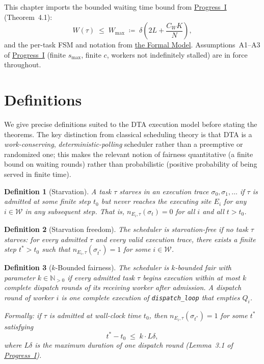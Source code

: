 \documentclass[11pt,a4paper]{article}
\newtheorem{definition}{Definition}[section]
\newcommand{\code}[1]{\texttt{#1}}
\begin{document}
\setcounter{section}{0}

This chapter imports the bounded waiting time bound from
\hyperref[chap:bounded_wait]{Progress~I} (Theorem~4.1):
\[
  W(\tau) \;\leq\; W_{\max}
  \;\coloneqq\; \delta\!\left(2L + \frac{C_W K}{N}\right),
\]
and the per-task FSM and notation from
\hyperref[chap:formal_model]{the Formal Model}.  Assumptions~A1--A3
of \hyperref[chap:bounded_wait]{Progress~I} (finite $s_{\max}$, finite $c$,
workers not indefinitely stalled) are in force throughout.

\section{Definitions}

We give precise definitions suited to the DTA execution model
before stating the theorems.  The key distinction from classical
scheduling theory is that DTA is a \emph{work-conserving},
\emph{deterministic-polling} scheduler rather than a preemptive
or randomized one; this makes the relevant notion of fairness
quantitative (a finite bound on waiting rounds) rather than
probabilistic (positive probability of being served in finite time).

\begin{definition}[Starvation]
\label{def:starve}
A task $\tau$ \emph{starves} in an execution trace
$\sigma_0, \sigma_1, \ldots$ if $\tau$ is admitted at some finite
step $t_0$ but never reaches the executing site $E_i$ for any
$i \in \mathcal{W}$ in any subsequent step.  That is,
$n_{E_i, \tau}(\sigma_t) = 0$ for all $i$ and all $t > t_0$.
\end{definition}

\begin{definition}[Starvation freedom]
\label{def:starve-free}
The scheduler is \emph{starvation-free} if no task $\tau$ starves:
for every admitted $\tau$ and every valid execution trace,
there exists a finite step $t^* > t_0$ such that
$n_{E_i, \tau}(\sigma_{t^*}) = 1$ for some $i \in \mathcal{W}$.
\end{definition}

\begin{definition}[$k$-Bounded fairness]

The scheduler is \emph{$k$-bounded fair} with parameter $k \in
\mathbb{N}_{>0}$ if every admitted task $\tau$ begins execution
within at most $k$ complete dispatch rounds of its receiving
worker after admission.  A \emph{dispatch round} of worker $i$
is one complete execution of \code{dispatch\_loop} that empties
$Q_i$.

Formally: if $\tau$ is admitted at wall-clock time $t_0$, then
$n_{E_i, \tau}(\sigma_{t^*}) = 1$ for some $t^*$ satisfying
\[
  t^* - t_0 \;\leq\; k \cdot L\delta,
\]
where $L\delta$ is the maximum duration of one dispatch round
(Lemma~3.1 of \hyperref[chap:bounded_wait]{Progress~I}).
\end{definition}
\end{document}
